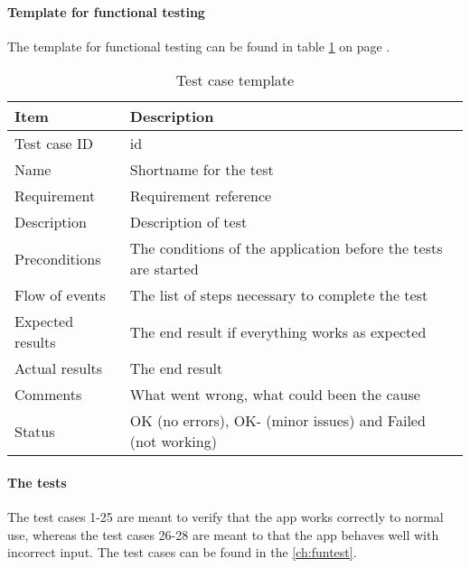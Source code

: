 			\paragraph{Template for functional testing}\hfill
\newline		
			The template for functional testing can be found in table \ref{tab:casetemp1} on page \pageref{tab:casetemp1}.	
				\begin{table}[h!]
\begin{center}
					\begin{tabular}{l|p{10cm}}\hline
\textbf{Item} & \textbf{Description} \\ \hline \hline
						Test case ID & id \\ \hline
						Name & Shortname for the test\\ \hline
						Requirement & Requirement reference\\ \hline
						Description & Description of test\\ \hline
						Preconditions & The conditions of the application before the tests are started\\ \hline
						Flow of events & The list of steps necessary to complete the test \\ \hline
						Expected results & The end result if everything works as expected\\ \hline 
						Actual results & The end result\\ \hline
						Comments & What went wrong, what could been the cause\\ \hline
						Status &OK (no errors), OK- (minor issues) and Failed (not working)\\ \hline
					\end{tabular}
\end{center}
				\caption{Test case template} \label{tab:casetemp1}
			\end{table}
			\paragraph{The tests}\hfill
\newline
				The test cases 1-25 are meant to verify that the app works correctly to normal use, whereas the test cases 26-28 are meant to that the app behaves well with incorrect input. The test cases can be found in the \ref{ch:funtest}.

